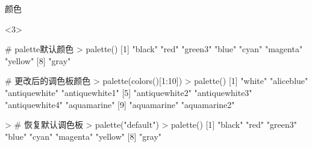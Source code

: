 \documentclass{beamerthemeMono}
\begin{document}
\begin{frame}[t,fragile]{\subsecname}{颜色}
\begin{overlayarea}{\textwidth}{\textheight}
\begin{onlyenv}<3>
\begin{rcode}
# palette默认颜色
> palette()
[1] "black"   "red"     "green3"  "blue"    "cyan"    "magenta" "yellow" 
[8] "gray" 

# 更改后的调色板颜色
> palette(colors()[1:10])
> palette()
 [1] "white"         "aliceblue"     "antiquewhite"  "antiquewhite1"
 [5] "antiquewhite2" "antiquewhite3" "antiquewhite4" "aquamarine"   
 [9] "aquamarine"    "aquamarine2"  

> # 恢复默认调色板
> palette("default")
> palette()
[1] "black"   "red"     "green3"  "blue"    "cyan"    "magenta" "yellow" 
[8] "gray" 
\end{rcode}
\end{onlyenv}
\end{overlayarea}  
\end{frame}
\end{document}
